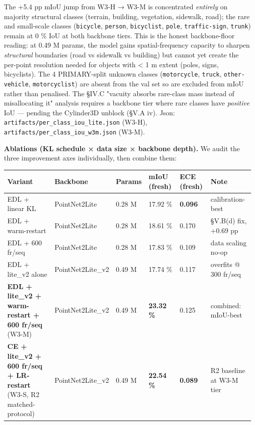 \documentclass[
]{article}
\newcounter{none} %
\begin{document}
The +5.4 pp mIoU jump from W3-H → W3-M is concentrated \emph{entirely}
on majority structural classes (terrain, building, vegetation, sidewalk,
road); the rare and small-scale classes (\texttt{bicycle},
\texttt{person}, \texttt{bicyclist}, \texttt{pole},
\texttt{traffic-sign}, \texttt{trunk}) remain at 0 \% IoU at both
backbone tiers. This is the honest backbone-floor reading: at 0.49 M
params, the model gains spatial-frequency capacity to sharpen
\emph{structural} boundaries (road vs sidewalk vs building) but cannot
yet create the per-point resolution needed for objects with \textless{}
1 m extent (poles, signs, bicyclists). The 4 PRIMARY-split unknown
classes (\texttt{motorcycle}, \texttt{truck}, \texttt{other-vehicle},
\texttt{motorcyclist}) are absent from the val set so are excluded from
mIoU rather than penalised. The §IV.C "vacuity absorbs rare-class mass
instead of misallocating it" analysis requires a backbone tier where
rare classes have \emph{positive} IoU --- pending the Cylinder3D unblock
(§V.A iv). Json: \texttt{artifacts/per\_class\_iou\_lite.json} (W3-H),
\texttt{artifacts/per\_class\_iou\_w3m.json} (W3-M).

\textbf{Ablations (KL schedule × data size × backbone depth).} We audit
the three improvement axes individually, then combine them:

{\def\LTcaptype{none} %
\begin{longtable}[]{@{}llllll@{}}
\toprule\noalign{}
Variant & Backbone & Params & mIoU (fresh) & ECE (fresh) & Note \\
\midrule\noalign{}
\endhead
\bottomrule\noalign{}
\endlastfoot
EDL + linear KL & PointNet2Lite & 0.28 M & 17.92 \% & \textbf{0.096} &
calibration-best \\
EDL + warm-restart & PointNet2Lite & 0.28 M & 18.61 \% & 0.170 & §V.B(d)
fix, +0.69 pp \\
EDL + 600 fr/seq & PointNet2Lite & 0.28 M & 17.83 \% & 0.109 & data
scaling no-op \\
EDL + lite\_v2 alone & PointNet2Lite\_v2 & 0.49 M & 17.74 \% & 0.117 &
overfits @ 300 fr/seq \\
\textbf{EDL + lite\_v2 + warm-restart + 600 fr/seq} (W3-M) &
PointNet2Lite\_v2 & 0.49 M & \textbf{23.32 \%} & 0.125 & combined:
mIoU-best \\
\textbf{CE + lite\_v2 + 600 fr/seq + LR-restart} (W3-S, R2
matched-protocol) & PointNet2Lite\_v2 & 0.49 M & \textbf{22.54 \%} &
\textbf{0.089} & R2 baseline at W3-M tier \\
\end{longtable}
}
\end{document}

